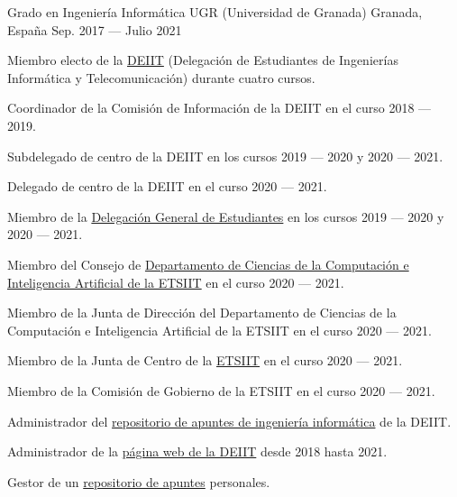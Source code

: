 
\begin{cventries}

\cventry%
	{Grado en Ingeniería Informática} %
	{UGR (Universidad de Granada)} %
	{Granada, España} %
	{Sep. 2017 --- Julio 2021} %
	{%
		\begin{cvitems} %
			\item
				Miembro electo de la \href{https://deiit.ugr.es/}{DEIIT} (Delegación de Estudiantes de Ingenierías Informática y Telecomunicación) durante cuatro cursos.
			\item
				Coordinador de la Comisión de Información de la DEIIT en el curso 2018 --- 2019.
			\item
				Subdelegado de centro de la DEIIT en los cursos 2019 --- 2020 y 2020 --- 2021.
			\item
				Delegado de centro de la DEIIT en el curso 2020 --- 2021.
			\item
				Miembro de la \href{https://dge.ugr.es/}{Delegación General de Estudiantes} en los cursos 2019 --- 2020 y 2020 --- 2021.
			\item
				Miembro del Consejo de \href{https://decsai.ugr.es/}{Departamento de Ciencias de la Computación e Inteligencia Artificial de la ETSIIT} en el curso 2020 --- 2021.
			\item
				Miembro de la Junta de Dirección del Departamento de Ciencias de la Computación e Inteligencia Artificial de la ETSIIT en el curso 2020 --- 2021.
			\item
				Miembro de la Junta de Centro de la \href{https://etsiit.ugr.es/}{ETSIIT} en el curso 2020 --- 2021.
			\item
				Miembro de la Comisión de Gobierno de la ETSIIT en el curso 2020 --- 2021.
			\item
				Administrador del \href{https://github.com/DEIIT/Ingenieria-Informatica}{repositorio de apuntes de ingeniería informática} de la DEIIT\@.
			\item
				Administrador de la \href{https://deiit.ugr.es/}{página web de la DEIIT} desde 2018 hasta 2021\@.
			\item
				Gestor de un \href{https://github.com/Groctel/ugr-informatica}{repositorio de apuntes} personales.
		\end{cvitems}
	}

\end{cventries}
